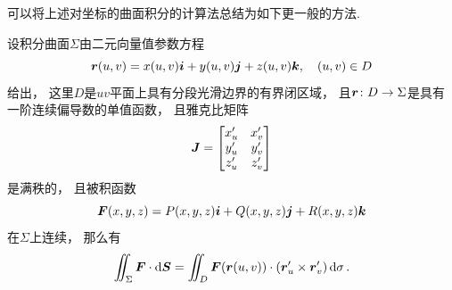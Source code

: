 可以将上述对坐标的曲面积分的计算法总结为如下更一般的方法.
\begin{theorem}
设积分曲面\(\Sigma\)由二元向量值参数方程\begin{equation*}
	\boldsymbol{r}(u,v) = x(u,v) \boldsymbol{i} + y(u,v) \boldsymbol{j} + z(u,v) \boldsymbol{k},
	\quad (u,v) \in D
\end{equation*}给出，
这里\(D\)是\(uv\)平面上具有分段光滑边界的有界闭区域，
且\(\boldsymbol{r}\colon D \to \Sigma\)是具有一阶连续偏导数的单值函数，
且雅克比矩阵\begin{equation*}
	\boldsymbol{J} = \begin{bmatrix}
		x'_u & x'_v \\
		y'_u & y'_v \\
		z'_u & z'_v
	\end{bmatrix}
\end{equation*}是满秩的，
且被积函数\begin{equation*}
	\boldsymbol{F}(x,y,z) = P(x,y,z) \boldsymbol{i} + Q(x,y,z) \boldsymbol{j} + R(x,y,z) \boldsymbol{k}
\end{equation*}在\(\Sigma\)上连续，
那么有\begin{equation}
	\iint_\Sigma \boldsymbol{F}\cdot\dd{\boldsymbol{S}}
	= \iint_D \boldsymbol{F}(\boldsymbol{r}(u,v))\cdot(\boldsymbol{r}'_u\times\boldsymbol{r}'_v)
			\dd{\sigma}.
\end{equation}
\end{theorem}

